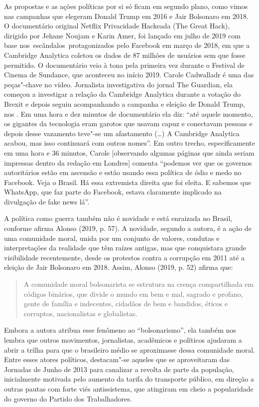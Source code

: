 As propostas e as ações políticas por si só ficam em segundo plano, como
vimos nas campanhas que elegeram Donald Trump em 2016 e Jair Bolsonaro
em 2018. O documentário original Netflix Privacidade Hackeada (The Great
Hack), dirigido por Jehane Noujam e Karin Amer, foi lançado em julho de
2019 com base nos~escândalos~protagonizados pelo Facebook em março de
2018, em que a Cambridge Analytica coletou os dados de 87 milhões de
usuários sem que fosse permitido. O documentário veio à tona pela
primeira vez durante o Festival de Cinema de Sundance, que aconteceu no
início 2019. Carole Cadwalladr é uma das peças"-chave no vídeo.
Jornalista investigativa do jornal The Guardian, ela começou a
investigar a relação da Cambridge Analytica durante a votação do Brexit
e depois seguiu acompanhando a campanha e eleição de Donald Trump, nos
. Em uma hora e dez minutos de documentário ela diz: ``até aquele
momento, os gigantes da tecnologia eram garotos que usavam capuz e
conectavam pessoas e depois desse vazamento teve"-se um afastamento (\ldots{})
A Cambridge Analytica acabou, mas isso continuará com outros nomes''. Em
outro trecho, especificamente em uma hora e 36 minutos, Carole
{[}observando algumas páginas que ainda seriam impressas dentro da
redação em Londres{]} comenta ``podemos ver que os governos autoritários
estão em ascensão e estão usando essa política de ódio e medo no
Facebook. Veja o Brasil. Há essa extremista direita que foi eleita. E
sabemos que WhatsApp, que faz parte do Facebook, estava claramente
implicado na divulgação de fake news lá''.

A política como guerra também não é novidade e está enraizada no Brasil,
conforme afirma Alonso (2019, p. 57). A novidade, segundo a autora, é a
ação de uma comunidade moral, unida por um conjunto de valores, condutas
e interpretações da realidade que têm raízes antigas, mas que
conquistara grande visibilidade recentemente, desde os protestos contra
a corrupção em 2011 até a eleição de Jair Bolsonaro em 2018. Assim,
Alonso (2019, p. 52) afirma que:

\begin{quote}
A comunidade moral bolsonarista se estrutura na crença compartilhada em
códigos binários, que divide o mundo em bem e mal, sagrado e profano,
gente de família e indecentes, cidadãos de bem e bandidos, éticos e
corruptos, nacionalistas e globalistas.
\end{quote}

Embora a autora atribua esse fenômeno ao ``bolsonarismo'', ela também
nos lembra que outros movimentos, jornalistas, acadêmicos e políticos
ajudaram a abrir a trilha para que o brasileiro médio se aproximasse
dessa comunidade moral. Entre esses atores políticos, destacam"-se
aqueles que se aproveitaram das Jornadas de Junho de 2013 para canalizar
a revolta de parte da população, inicialmente motivada pelo aumento da
tarifa do transporte público, em direção a outras pautas com forte viés
antissistema, que atingiram em cheio a popularidade do governo do
Partido dos Trabalhadores.

